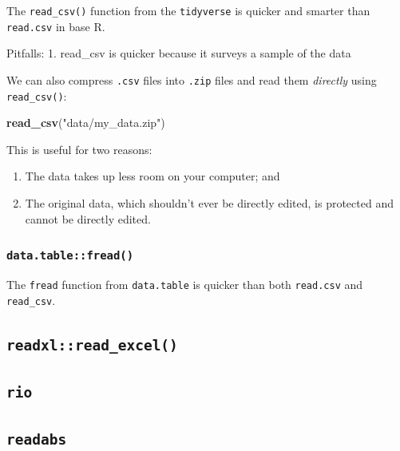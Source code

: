 \documentclass[]{book}
\newenvironment{Shaded}{\begin{snugshade}}{\end{snugshade}}
\newcommand{\KeywordTok}[1]{\textcolor[rgb]{0.13,0.29,0.53}{\textbf{#1}}}
\newcommand{\NormalTok}[1]{#1}
\newcommand{\StringTok}[1]{\textcolor[rgb]{0.31,0.60,0.02}{#1}}
\providecommand{\tightlist}{%
  \setlength{\itemsep}{0pt}\setlength{\parskip}{0pt}}
\begin{document}
The \texttt{read\_csv()} function from the \texttt{tidyverse} is quicker and smarter than \texttt{read.csv} in base R.

Pitfalls:
1. read\_csv is quicker because it surveys a sample of the data

We can also compress \texttt{.csv} files into \texttt{.zip} files and read them \emph{directly} using \texttt{read\_csv()}:

\begin{Shaded}
\begin{Highlighting}[]
\KeywordTok{read_csv}\NormalTok{(}\StringTok{"data/my_data.zip"}\NormalTok{)}
\end{Highlighting}
\end{Shaded}

This is useful for two reasons:

\begin{enumerate}
\def\labelenumi{\arabic{enumi}.}
\tightlist
\item
  The data takes up less room on your computer; and
\item
  The original data, which shouldn't ever be directly edited, is protected and cannot be directly edited.
\end{enumerate}

\hypertarget{data.tablefread}{%
\subsubsection{\texorpdfstring{\texttt{data.table::fread()}}{data.table::fread()}}\label{data.tablefread}}

The \texttt{fread} function from \texttt{data.table} is quicker than both \texttt{read.csv} and \texttt{read\_csv}.

\hypertarget{readxlread_excel}{%
\subsection{\texorpdfstring{\texttt{readxl::read\_excel()}}{readxl::read\_excel()}}\label{readxlread_excel}}

\hypertarget{rio}{%
\subsection{\texorpdfstring{\texttt{rio}}{rio}}\label{rio}}

\hypertarget{readabs}{%
\subsection{\texorpdfstring{\texttt{readabs}}{readabs}}\label{readabs}}
\end{document}
